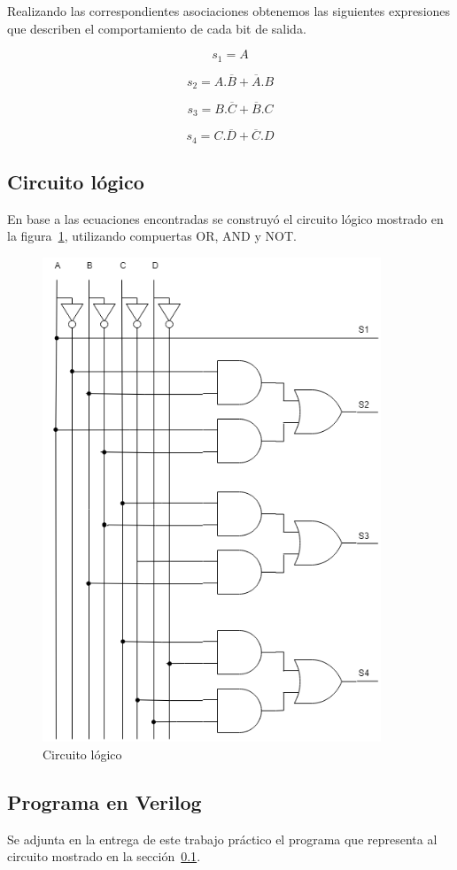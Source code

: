 Realizando las correspondientes asociaciones obtenemos las siguientes expresiones que describen el comportamiento de cada bit de salida.

\begin{equation}\label{s1_Karnaugh}
    s_{1}= A
\end{equation}

\begin{equation}\label{s2_Karnaugh}
    s_{2}= A.\overline{B}+\overline{A}.B
\end{equation}

\begin{equation}\label{s3_Karnaugh}
    s_{3}= B.\overline{C}+\overline{B}.C
\end{equation}

\begin{equation}\label{s4_Karnaugh}
    s_{4}= C.\overline{D}+\overline{C}.D
\end{equation}

\subsection{Circuito l\'ogico}\label{ej2_circ}

En base a las ecuaciones encontradas se construy\'o el circuito l\'ogico mostrado en la figura~\ref{fig:ej4_circuito_logico}, utilizando compuertas \textsc{OR}, \textsc{AND} y \textsc{NOT}.

\begin{figure}[h!]
    \centering
    \includegraphics[width=0.9\textwidth]{./EJ_4/EJ4_TP1_Electro3.png}
    \caption{Circuito l\'ogico}
    \label{fig:ej4_circuito_logico}
\end{figure}

\subsection{Programa en Verilog}
Se adjunta en la entrega de este trabajo pr\'actico el programa que representa al circuito mostrado en la secci\'on~\ref{ej2_circ}.

